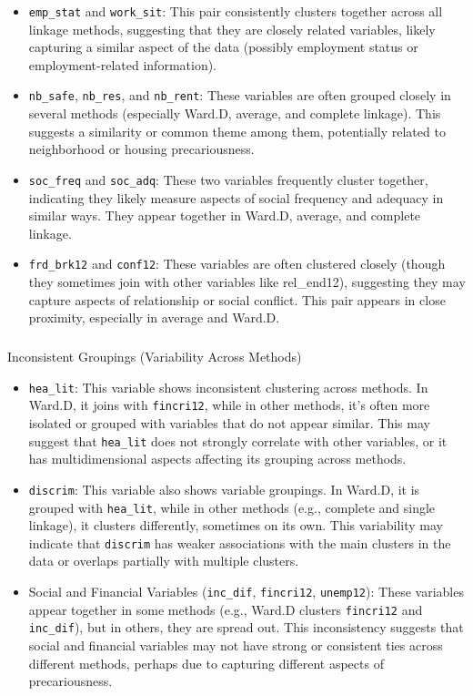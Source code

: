 \documentclass[
]{article}
\makeatletter
\let\oldsubparagraph\subparagraph
\renewcommand{\subparagraph}{
    \@ifstar
      \xxxSubParagraphStar
      \xxxSubParagraphNoStar
  }
\newcommand{\xxxSubParagraphStar}[1]{\oldsubparagraph*{#1}\mbox{}}
\newcommand{\xxxSubParagraphNoStar}[1]{\oldsubparagraph{#1}\mbox{}}
\makeatother
\begin{document}
\begin{itemize}
\item
  \texttt{emp\_stat} and \texttt{work\_sit}: This pair consistently
  clusters together across all linkage methods, suggesting that they are
  closely related variables, likely capturing a similar aspect of the
  data (possibly employment status or employment-related information).
\item
  \texttt{nb\_safe}, \texttt{nb\_res}, and \texttt{nb\_rent}: These
  variables are often grouped closely in several methods (especially
  Ward.D, average, and complete linkage). This suggests a similarity or
  common theme among them, potentially related to neighborhood or
  housing precariousness.
\item
  \texttt{soc\_freq} and \texttt{soc\_adq}: These two variables
  frequently cluster together, indicating they likely measure aspects of
  social frequency and adequacy in similar ways. They appear together in
  Ward.D, average, and complete linkage.
\item
  \texttt{frd\_brk12} and \texttt{conf12}: These variables are often
  clustered closely (though they sometimes join with other variables
  like rel\_end12), suggesting they may capture aspects of relationship
  or social conflict. This pair appears in close proximity, especially
  in average and Ward.D.
\end{itemize}

\subparagraph{Inconsistent Groupings (Variability Across
Methods)}\label{inconsistent-groupings-variability-across-methods}

\begin{itemize}
\item
  \texttt{hea\_lit}: This variable shows inconsistent clustering across
  methods. In Ward.D, it joins with \texttt{fincri12}, while in other
  methods, it's often more isolated or grouped with variables that do
  not appear similar. This may suggest that \texttt{hea\_lit} does not
  strongly correlate with other variables, or it has multidimensional
  aspects affecting its grouping across methods.
\item
  \texttt{discrim}: This variable also shows variable groupings. In
  Ward.D, it is grouped with \texttt{hea\_lit}, while in other methods
  (e.g., complete and single linkage), it clusters differently,
  sometimes on its own. This variability may indicate that
  \texttt{discrim} has weaker associations with the main clusters in the
  data or overlaps partially with multiple clusters.
\item
  Social and Financial Variables (\texttt{inc\_dif}, \texttt{fincri12},
  \texttt{unemp12}): These variables appear together in some methods
  (e.g., Ward.D clusters \texttt{fincri12} and \texttt{inc\_dif}), but
  in others, they are spread out. This inconsistency suggests that
  social and financial variables may not have strong or consistent ties
  across different methods, perhaps due to capturing different aspects
  of precariousness.
\end{itemize}
\end{document}
